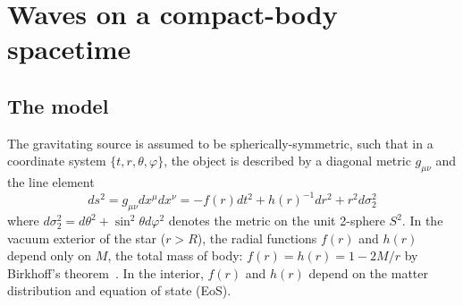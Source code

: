 \documentclass[aps,prd,longbibliography,reprint,twocolumn,amsmath,amssymb,amsfonts,showpacs,footnote,superscriptaddress]{revtex4-1}%
\begin{document}
\section{Waves on a compact-body spacetime} \label{SecII}



\subsection{The model}
\label{SecIIa}

The gravitating source is assumed to be spherically-symmetric, such that in a coordinate system $\{t,r,\theta,\varphi\}$, the object is described by a diagonal metric $g_{\mu \nu}$ and the line element
\begin{equation}\label{Line_elem}
 ds^2 = g_{\mu \nu} dx^\mu dx^\nu = -f(r) dt^2+h(r)^{-1}dr^2+r^2d\sigma_2^2
\end{equation}
where $d\sigma_2^2 = d\theta^2 + \sin^2 \theta d\varphi^2$ denotes the metric on the unit 2-sphere $S^2$. In the vacuum exterior of the star ($r>R$), the radial functions $f(r)$ and $h(r)$ depend only on $M$, the total mass of body: $f(r)=h(r)=1-2M/r$ by Birkhoff's theorem~\cite{VojeJohansen:2005nd}. In the interior, $f(r)$ and $h(r)$ depend on the matter distribution and equation of state (EoS).
\end{document}

